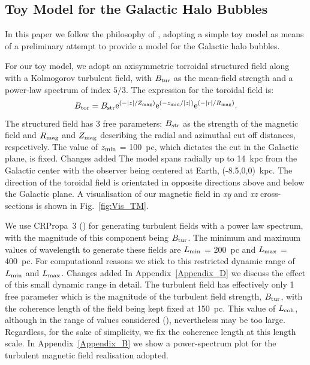 \documentclass[usenatbib]{mnras}
\newcommand{\Vasu}[1]{{\color{purple}#1}}
\begin{document}
\subsection{Toy Model for the Galactic Halo Bubbles}
\label{GMF}
In this paper we follow the philosophy of \cite{West_Helicity}, adopting a simple toy model as means of a preliminary attempt to provide a model for the Galactic halo bubbles. 

For our toy model, we adopt an axisymmetric torroidal structured field along with a Kolmogorov turbulent field, with $B_{\rm{tur}}$ as the mean-field strength and a power-law spectrum of index $5/3$. The expression for the toroidal field is:
\begin{equation}\label{TM_equation}
B_{\rm{tor}} = B_{\rm{str}} {\rm{e}}^{(-|z|/Z_{\rm{mag}})} {\rm{e}}^{(-z_{\rm{min}}/|z|)} {\rm{e}}^{(-|r|/R_{\rm{mag}})}.
\end{equation}
The structured field has 3 free parameters: $B_{\rm str}$ as the strength of the magnetic field and $R_{\rm {mag}}$ and $Z_{\rm {mag}}$ describing the radial and azimuthal cut off distances, respectively. The value of $z_{\rm min}$ = 100~pc, which dictates the cut in the Galactic plane, is fixed. \Vasu{Changes added} The model spans radially up to 14~kpc from the Galactic center with the observer being centered at Earth, (-8.5,0,0)~kpc. The direction of the toroidal field is orientated in opposite directions above and below the Galactic plane. A visualisation of our magnetic field in \textit{xy} and \textit{xz} cross-sections is shown in Fig.~\ref{fig:Vis_TM}. 

We use CRPropa~3 (\cite{CRPropa3_2016}) for generating turbulent fields with a power law spectrum, with the magnitude of this component being $B_{\rm{tur}}$. 
The minimum and maximum values of wavelength to generate these fields are  $L_{\rm min}$ = 200~pc and $L_{\rm max}$ = 400~pc. For computational reasons we stick to this restricted dynamic range of $L_{\rm min}$ and $L_{\rm max}$. \Vasu{Changes added} In Appendix~\ref{Appendix_D} we discuss the effect of this small dynamic range in detail. The turbulent field has effectively only 1 free parameter which is the magnitude of the turbulent field strength, $ B_{\rm tur}$, with the coherence length of the field being kept fixed at 150~pc. This value of $L_{\rm coh}$, although in the range of values considered (\cite{Ohno_1993, Chepurnov_2010, Haverkorn_2013, Giacinti_2018}), nevertheless may be too large. Regardless, for the sake of simplicity, we fix the coherence length at this length scale. In Appendix~\ref{Appendix_B} we show a power-spectrum plot for the turbulent magnetic field realisation adopted.
\end{document}
